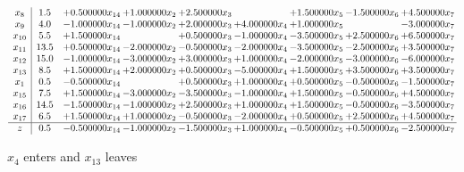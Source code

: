 \documentclass[10pt]{article}
\begin{document}
 \[\begin{array}{c| c c@{\hskip 2pt} c@{\hskip 2pt} c@{\hskip 2pt} c@{\hskip 2pt} c@{\hskip 2pt} c@{\hskip 2pt} c@{\hskip 2pt} }
 x_{8}   &  1.5 & + 0.500000 x_{14} & + 1.000000 x_{2} & + 2.500000 x_{3} &   & + 1.500000 x_{5} & -1.500000 x_{6} & + 4.500000 x_{7}\\
 x_{9}   &  4.0 & -1.000000 x_{14} & -1.000000 x_{2} & + 2.000000 x_{3} & + 4.000000 x_{4} & + 1.000000 x_{5} &   & -3.000000 x_{7}\\
 x_{10}   &  5.5 & + 1.500000 x_{14} &   & + 0.500000 x_{3} & -1.000000 x_{4} & -3.500000 x_{5} & + 2.500000 x_{6} & + 6.500000 x_{7}\\
 x_{11}   &  13.5 & + 0.500000 x_{14} & -2.000000 x_{2} & -0.500000 x_{3} & -2.000000 x_{4} & -3.500000 x_{5} & -2.500000 x_{6} & + 3.500000 x_{7}\\
 x_{12}   &  15.0 & -1.000000 x_{14} & -3.000000 x_{2} & + 3.000000 x_{3} & + 1.000000 x_{4} & -2.000000 x_{5} & -3.000000 x_{6} & -6.000000 x_{7}\\
 x_{13}   &  8.5 & + 1.500000 x_{14} & + 2.000000 x_{2} & + 0.500000 x_{3} & -5.000000 x_{4} & + 1.500000 x_{5} & + 3.500000 x_{6} & + 3.500000 x_{7}\\
 x_{1}   &  0.5 & -0.500000 x_{14} &   & + 0.500000 x_{3} & + 1.000000 x_{4} & + 0.500000 x_{5} & -0.500000 x_{6} & -1.500000 x_{7}\\
 x_{15}   &  7.5 & + 1.500000 x_{14} & -3.000000 x_{2} & -3.500000 x_{3} & -1.000000 x_{4} & + 1.500000 x_{5} & -0.500000 x_{6} & + 4.500000 x_{7}\\
 x_{16}   &  14.5 & -1.500000 x_{14} & -1.000000 x_{2} & + 2.500000 x_{3} & + 1.000000 x_{4} & + 1.500000 x_{5} & -0.500000 x_{6} & -3.500000 x_{7}\\
 x_{17}   &  6.5 & + 1.500000 x_{14} & + 1.000000 x_{2} & -0.500000 x_{3} & -2.000000 x_{4} & + 0.500000 x_{5} & + 2.500000 x_{6} & + 4.500000 x_{7}\\
\hline
z    &  0.5 & -0.500000 x_{14} & -1.000000 x_{2} & -1.500000 x_{3} & + 1.000000 x_{4} & -0.500000 x_{5} & + 0.500000 x_{6} & -2.500000 x_{7}\\
\end{array}\]


 $ x_{4} $ enters and $ x_{13} $ leaves 
\end{document}
